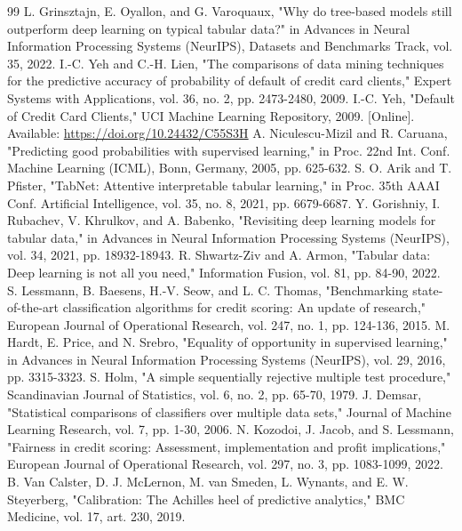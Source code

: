 \documentclass[conference,a4paper]{IEEEtran}
\begin{document}
\begin{thebibliography}{99}
 L. Grinsztajn, E. Oyallon, and G. Varoquaux, "Why do tree-based models still outperform deep learning on typical tabular data?" in Advances in Neural Information Processing Systems (NeurIPS), Datasets and Benchmarks Track, vol. 35, 2022.
 I.-C. Yeh and C.-H. Lien, "The comparisons of data mining techniques for the predictive accuracy of probability of default of credit card clients," Expert Systems with Applications, vol. 36, no. 2, pp. 2473-2480, 2009.
 I.-C. Yeh, "Default of Credit Card Clients," UCI Machine Learning Repository, 2009. [Online]. Available: \url{https://doi.org/10.24432/C55S3H}
 A. Niculescu-Mizil and R. Caruana, "Predicting good probabilities with supervised learning," in Proc. 22nd Int. Conf. Machine Learning (ICML), Bonn, Germany, 2005, pp. 625-632.
 S. O. Arik and T. Pfister, "TabNet: Attentive interpretable tabular learning," in Proc. 35th AAAI Conf. Artificial Intelligence, vol. 35, no. 8, 2021, pp. 6679-6687.
 Y. Gorishniy, I. Rubachev, V. Khrulkov, and A. Babenko, "Revisiting deep learning models for tabular data," in Advances in Neural Information Processing Systems (NeurIPS), vol. 34, 2021, pp. 18932-18943.
 R. Shwartz-Ziv and A. Armon, "Tabular data: Deep learning is not all you need," Information Fusion, vol. 81, pp. 84-90, 2022.
 S. Lessmann, B. Baesens, H.-V. Seow, and L. C. Thomas, "Benchmarking state-of-the-art classification algorithms for credit scoring: An update of research," European Journal of Operational Research, vol. 247, no. 1, pp. 124-136, 2015.
 M. Hardt, E. Price, and N. Srebro, "Equality of opportunity in supervised learning," in Advances in Neural Information Processing Systems (NeurIPS), vol. 29, 2016, pp. 3315-3323.
 S. Holm, "A simple sequentially rejective multiple test procedure," Scandinavian Journal of Statistics, vol. 6, no. 2, pp. 65-70, 1979.
 J. Demsar, "Statistical comparisons of classifiers over multiple data sets," Journal of Machine Learning Research, vol. 7, pp. 1-30, 2006.
 N. Kozodoi, J. Jacob, and S. Lessmann, "Fairness in credit scoring: Assessment, implementation and profit implications," European Journal of Operational Research, vol. 297, no. 3, pp. 1083-1099, 2022.
 B. Van Calster, D. J. McLernon, M. van Smeden, L. Wynants, and E. W. Steyerberg, "Calibration: The Achilles heel of predictive analytics," BMC Medicine, vol. 17, art. 230, 2019.
\end{thebibliography}
\end{document}
